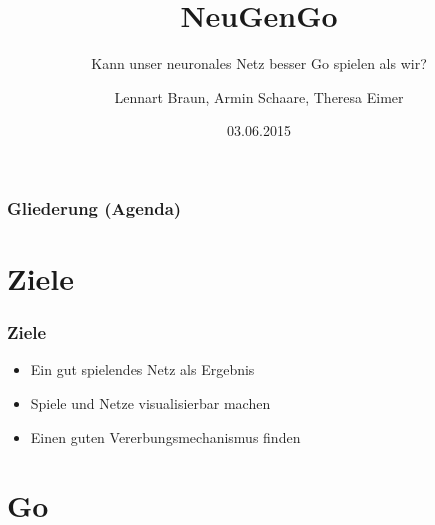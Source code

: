 \documentclass[compress]{beamer}
\title{NeuGenGo}
\subtitle{Kann unser neuronales Netz besser Go spielen als wir?}
\author{Lennart Braun, Armin Schaare, Theresa Eimer}
\institute{Praktikum Parallele Programmierung \\Fachbereich Informatik\\Universität Hamburg}
\date{03.06.2015}
\begin{document}
\begin{frame}
	\titlepage
\end{frame}

\begin{frame}
	\frametitle{Gliederung (Agenda)}

	\tableofcontents
\end{frame}

\section{Ziele}

\begin{frame}
	\frametitle{Ziele}
	
	\begin{itemize}
		\item Ein gut spielendes Netz als Ergebnis
		\item Spiele und Netze visualisierbar machen
		\item Einen guten Vererbungsmechanismus finden
	\end{itemize}
	
\end{frame}

\section{Go}
\end{document}

